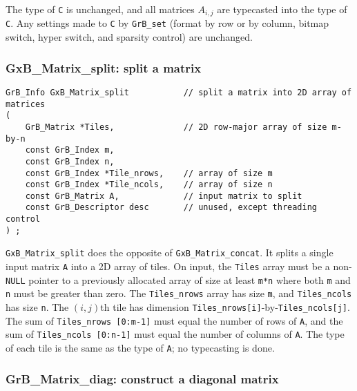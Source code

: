 \documentclass[12pt]{article}
\begin{document}
The type of \verb'C' is unchanged, and all matrices $A_{i,j}$ are typecasted
into the type of \verb'C'.  Any settings made to \verb'C' by
\verb'GrB_set' (format by row or by column, bitmap switch, hyper
switch, and sparsity control) are unchanged.

\subsubsection{{\sf GxB\_Matrix\_split:} split a matrix   }
\label{matrix_split}

\begin{mdframed}[userdefinedwidth=6in]
{\footnotesize
\begin{verbatim}
GrB_Info GxB_Matrix_split           // split a matrix into 2D array of matrices
(
    GrB_Matrix *Tiles,              // 2D row-major array of size m-by-n
    const GrB_Index m,
    const GrB_Index n,
    const GrB_Index *Tile_nrows,    // array of size m
    const GrB_Index *Tile_ncols,    // array of size n
    const GrB_Matrix A,             // input matrix to split
    const GrB_Descriptor desc       // unused, except threading control
) ;
\end{verbatim} } \end{mdframed}

\verb'GxB_Matrix_split' does the opposite of \verb'GxB_Matrix_concat'.  It
splits a single input matrix \verb'A' into a 2D array of tiles.  On input, the
\verb'Tiles' array must be a non-\verb'NULL' pointer to a previously allocated
array of size at least \verb'm*n' where both \verb'm' and \verb'n' must be
greater than zero.  The \verb'Tiles_nrows' array has size \verb'm', and
\verb'Tiles_ncols' has size \verb'n'.  The $(i,j)$th tile has dimension
\verb'Tiles_nrows[i]'-by-\verb'Tiles_ncols[j]'.  The sum of
\verb'Tiles_nrows [0:m-1]' must equal the number of rows of \verb'A', and the
sum of \verb'Tiles_ncols [0:n-1]' must equal the number of columns of \verb'A'.
The type of each tile is the same as the type of \verb'A'; no typecasting is
done.

\subsubsection{{\sf GrB\_Matrix\_diag:} construct a diagonal matrix}
\label{matrix_diag}
\end{document}

